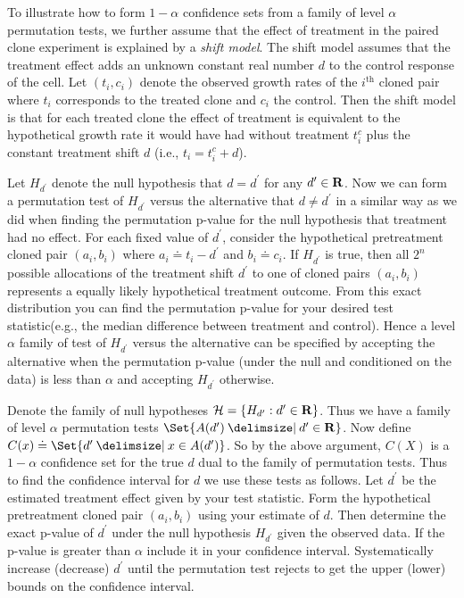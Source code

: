 \begin{example}[continues=exa:cont] To illustrate how to form $1-\alpha$
confidence sets from a family of level $\alpha$ permutation tests, we further
assume that the effect of treatment in the paired clone experiment is explained
by a \emph{shift model}.  The shift model assumes that the treatment effect
adds an unknown constant real number $d$ to the control response of the cell.
Let $(t_i, c_i)$ denote the observed growth rates of the $i^\text{th}$ cloned
pair where $t_i$ corresponds to the treated clone and $c_i$ the control.  Then
the shift model is that for each treated clone the effect of treatment is
equivalent to the hypothetical growth rate it would have had without treatment
$t_i^c$ plus the constant treatment shift $d$ (i.e., $t_i = t_i^c + d$).

Let $H_{d^\prime}$ denote the null hypothesis that $d=d^\prime$ for any
$d^\prime \in \mathbf{R}$.  Now we can form a permutation test of $H_{d^\prime}$
versus the alternative that $d \neq d^\prime$ in a similar way as we did when
finding the permutation p-value for the null hypothesis that treatment had no
effect. For each fixed value of $d^\prime$, consider the hypothetical
pretreatment cloned pair $(a_i, b_i)$ where $a_i\doteq t_i-d^\prime$ and $b_i
\doteq c_i$. If $H_{d^\prime}$ is true, then all $2^n$ possible allocations of
the treatment shift $d^\prime$ to one of cloned pairs $(a_i, b_i)$ represents a
equally likely hypothetical treatment outcome. From this exact distribution you
can find the permutation p-value for your desired test statistic(e.g., the
median difference between treatment and control). Hence a level $\alpha$ family
of test of $H_{d^\prime}$ versus the alternative can be specified by accepting
the alternative when the permutation p-value (under the null and conditioned on
the data) is less than $\alpha$ and accepting $H_{d^\prime}$ otherwise. 

Denote the family of null hypotheses $\mathcal{H} = \{H_{d^\prime} : d^\prime
\in \mathbf{R}\}$.  Thus we have a family of level $\alpha$ permutation tests
$\Set{A(d^\prime) \given d^\prime \in \reals}$. Now define $C(x) \doteq \Set{d' \given x \in
A(d')}$.  So by the above argument, $C(X)$ is a $1-\alpha$ confidence set
for the true $d$ dual to the family of permutation tests.
Thus to find the confidence interval for $d$ we use these tests as follows.
Let $d^\prime$ be the estimated treatment effect given by your test statistic.
Form the hypothetical pretreatment cloned pair $(a_i, b_i)$ using your estimate
of $d$.  Then determine the exact p-value of $d^\prime$ under the null
hypothesis $H_{d^\prime}$ given the observed data. If the p-value is greater
than $\alpha$ include it in your confidence interval.  Systematically increase
(decrease) $d^\prime$ until the permutation test rejects to get the upper (lower)
bounds on the confidence interval.


\end{example}
